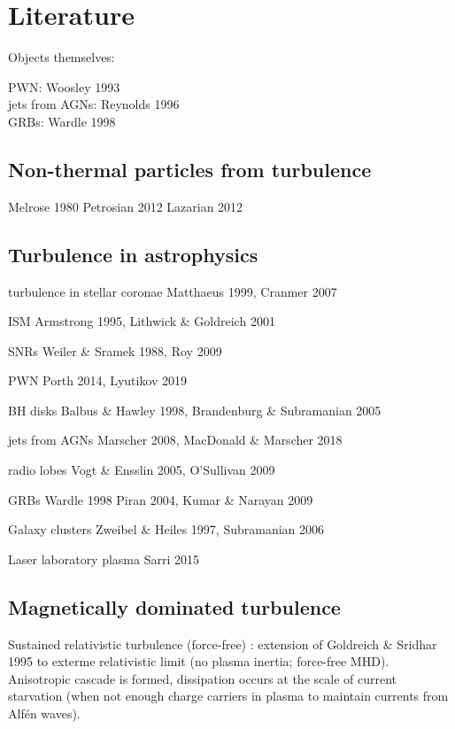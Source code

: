 \documentclass{aa}
\begin{document}
\section{Literature}\label{sect:literature}

Objects themselves:

PWN: Woosley 1993 \\
jets from AGNs: Reynolds 1996 \\
GRBs: Wardle 1998 \\



\subsection{Non-thermal particles from turbulence}
Melrose 1980
Petrosian 2012
Lazarian 2012

\subsection{Turbulence in astrophysics}


turbulence in stellar coronae
Matthaeus 1999, Cranmer 2007

ISM
Armstrong 1995, Lithwick \& Goldreich 2001

SNRs 
Weiler \& Sramek 1988, Roy 2009

PWN
Porth 2014, Lyutikov 2019

BH disks
Balbus \& Hawley 1998, Brandenburg \& Subramanian 2005

jets from AGNs
Marscher 2008, MacDonald \& Marscher 2018

radio lobes
Vogt \& Ensslin 2005, O'Sullivan 2009

GRBs
Wardle 1998
Piran 2004, Kumar \& Narayan 2009

Galaxy clusters 
Zweibel \& Heiles 1997, Subramanian 2006

Laser laboratory plasma
Sarri 2015






\subsection{Magnetically dominated turbulence}
Sustained relativistic turbulence (force-free)
\citep{Thompson_1998}: extension of Goldreich \& Sridhar 1995 to exterme relativistic limit (no plasma inertia; force-free MHD).
Anisotropic cascade is formed, dissipation occurs at the scale of current starvation (when not enough charge carriers in plasma to maintain currents from Alf\'en waves).
\end{document}
